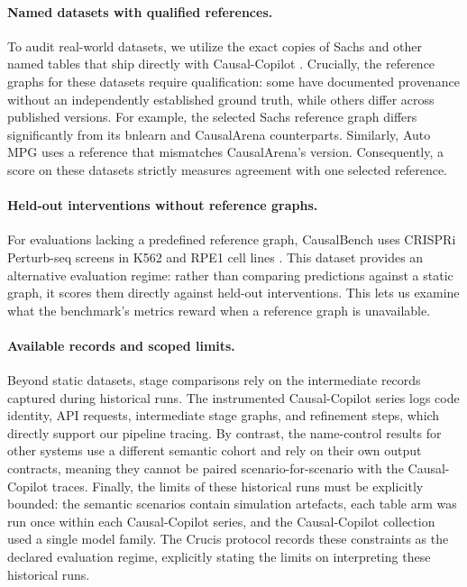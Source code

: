 \documentclass[12pt,letterpaper]{article}
\newcommand{\ours}{}
\begin{document}
\paragraph{Named datasets with qualified references.}
To audit real-world datasets, we utilize the exact copies of Sachs and other named tables that ship directly with Causal-Copilot \citep{wang2025causalcopilot,sachs2005causal}. Crucially, the reference graphs for these datasets require qualification: some have documented provenance without an independently established ground truth, while others differ across published versions. For example, the selected Sachs reference graph differs significantly from its bnlearn and CausalArena counterparts. Similarly, Auto MPG \citep{quinlan1993autompg} uses a reference that mismatches CausalArena's version. Consequently, a score on these datasets strictly measures agreement with one selected reference.

\paragraph{Held-out interventions without reference graphs.}
For evaluations lacking a predefined reference graph, CausalBench uses CRISPRi Perturb-seq screens in K562 and RPE1 cell lines \citep{chevalley2025causalbench,replogle2022mapping}. This dataset provides an alternative evaluation regime: rather than comparing predictions against a static graph, it scores them directly against held-out interventions. This lets us examine what the benchmark's metrics reward when a reference graph is unavailable.

\paragraph{Available records and scoped limits.}
Beyond static datasets, stage comparisons rely on the intermediate records captured during historical runs. The instrumented Causal-Copilot series logs code identity, API requests, intermediate stage graphs, and refinement steps, which directly support our pipeline tracing. By contrast, the name-control results for other systems use a different semantic cohort and rely on their own output contracts, meaning they cannot be paired scenario-for-scenario with the Causal-Copilot traces. Finally, the limits of these historical runs must be explicitly bounded: the semantic scenarios contain simulation artefacts, each table arm was run once within each Causal-Copilot series, and the Causal-Copilot collection used a single model family. The Crucis protocol records these constraints as the declared evaluation regime, explicitly stating the limits on interpreting these historical runs\ours.
\end{document}
